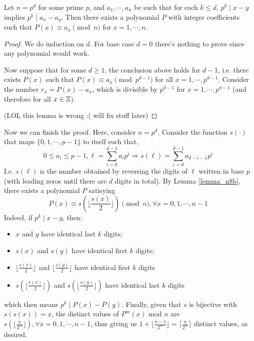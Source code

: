 \documentclass[11pt,a4paper]{article}
\begin{document}
\begin{enumerate}
        \begin{lemma}
        	\label{lemma_n8b}
        	Let $n=p^d$ for some prime $p$, and $a_1, \cdots, a_n$ be such that for each $k\le d$, 
        	$p^k \mid x-y$ implies $p^k\mid a_x-a_y$. 
        	Then there exists a polynomial $P$ with integer coefficients such that $P(x)\equiv a_x\pmod{n}$ for $x=1, \cdots, n$. 
        \end{lemma}
        \begin{proof}
        	We do induction on $d$. For base case $d=0$ there's nothing to prove since any polynomial would work. 
        	
        	Now suppose that for some $d\ge 1$, the conclusion above holds for $d-1$, 
        	i.e. there exists $P(x)$ such that $P(x)\equiv a_x\pmod{p^{d-1}}$ for all $x=1, \cdots, p^{d-1}$. 
        	Consider the number $r_x = P(x)-a_x$, which is divisible by $p^{d-1}$ for $x=1, \cdots, p^{d-1}$ (and therefore for all $x\in{\mathbb Z}$). 
        	
        	(LOL this lemma is wrong :( will fix stuff later)
        \end{proof}
        
        Now we can finish the proof. Here, consider $n=p^d$. 
        Consider the function $s(\cdot)$ that maps $\{0, 1, \cdots, p - 1\}$ to itself such that, 
        \[
        0\le a_i\le p - 1, 
          \ell = \sum_{i=0}^{d-1} a_ip^i \Rightarrow s(\ell) = \sum_{i=0}^{d-1} a_{d-i-1}p^i 
        \] 
        I.e. $s(\ell)$ is the number obtained by reversing the digits of $\ell$ written in base $p$ (with leading zeros until there are $d$ digits in total). 
        By Lemma \ref{lemma_n8b}, there exists a polynomial $P$ satisying 
        \[
        P(x) \equiv s(\lfloor \frac{s(x)}{2} \rfloor)\pmod{n}, \forall x=0, 1, \cdots, n-1
        \]
        Indeed, if $p^k\mid x-y$, then:
        \begin{itemize}
        	\item $x$ and $y$ have identical last $k$ digits;
        	\item $s(x)$ and $s(y)$ have identical first $k$ digits;
        	\item $\lfloor \frac{s(x)}{2} \rfloor$ and $\lfloor \frac{s(y)}{2} \rfloor$ have identical first $k$ digits
        	\item $s(\lfloor \frac{s(x)}{2} \rfloor)$ and $s(\lfloor \frac{s(y)}{2} \rfloor)$ have identical last $k$ digits
        \end{itemize}
        which then means $p^k \mid P(x)-P(y)$. 
        Finally, given that $s$ is bijective with $s(s(x))=x$, the distinct values of $P^m(x)$ mod $n$ are 
        $s(\lfloor \frac{x}{2^m}\rfloor), \forall x=0, 1, \cdots, n-1$, thus giving us 
        $1 + \lfloor \frac{n - 1}{2^m}\rfloor=\lceil \frac{n}{2^m}\rceil$ distinct values, as desired. 
         
	\end{enumerate}
\end{document}
